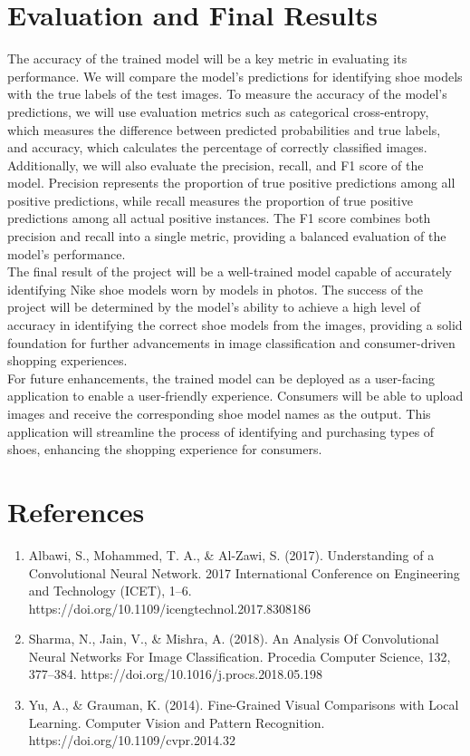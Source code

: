 \documentclass[11pt,a4paper]{article}
\begin{document}
\section{Evaluation and Final Results} 
The accuracy of the trained model will be a key metric in evaluating its performance. We will compare the model's predictions for identifying shoe models with the true labels of the test images. To measure the accuracy of the model's predictions, we will use evaluation metrics such as categorical cross-entropy, which measures the difference between predicted probabilities and true labels, and accuracy, which calculates the percentage of correctly classified images. Additionally, we will also evaluate the precision, recall, and F1 score of the model. Precision represents the proportion of true positive predictions among all positive predictions, while recall measures the proportion of true positive predictions among all actual positive instances. The F1 score combines both precision and recall into a single metric, providing a balanced evaluation of the model's performance. \\

  
  

The final result of the project will be a well-trained model capable of accurately identifying Nike shoe models worn by models in photos. The success of the project will be determined by the model's ability to achieve a high level of accuracy in identifying the correct shoe models from the images, providing a solid foundation for further advancements in image classification and consumer-driven shopping experiences. \\

  
  

For future enhancements, the trained model can be deployed as a user-facing application to enable a user-friendly experience. Consumers will be able to upload images and receive the corresponding shoe model names as the output. This application will streamline the process of identifying and purchasing types of shoes, enhancing the shopping experience for consumers. 
\section{References} 
		\begin{enumerate}
		\item Albawi, S., Mohammed, T. A., \& Al-Zawi, S. (2017). Understanding of a Convolutional Neural Network. 2017 International Conference on Engineering and Technology (ICET), 1–6. https://doi.org/10.1109/icengtechnol.2017.8308186  
		\item Sharma, N., Jain, V., \& Mishra, A. (2018). An Analysis Of Convolutional Neural Networks For Image Classification. Procedia Computer Science, 132, 377–384. https://doi.org/10.1016/j.procs.2018.05.198
		\item Yu, A., \& Grauman, K. (2014). Fine-Grained Visual Comparisons with Local Learning. Computer Vision and Pattern Recognition. https://doi.org/10.1109/cvpr.2014.32 
		\end{enumerate}
\end{document}
